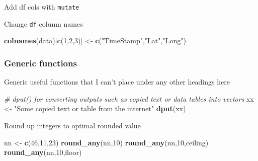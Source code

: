 \documentclass[10,portrait]{article}
\newenvironment{Shaded}{\begin{snugshade}}{\end{snugshade}}
\newcommand{\KeywordTok}[1]{\textcolor[rgb]{0.13,0.29,0.53}{\textbf{#1}}}
\newcommand{\DataTypeTok}[1]{\textcolor[rgb]{0.13,0.29,0.53}{#1}}
\newcommand{\DecValTok}[1]{\textcolor[rgb]{0.00,0.00,0.81}{#1}}
\newcommand{\StringTok}[1]{\textcolor[rgb]{0.31,0.60,0.02}{#1}}
\newcommand{\CommentTok}[1]{\textcolor[rgb]{0.56,0.35,0.01}{\textit{#1}}}
\newcommand{\OperatorTok}[1]{\textcolor[rgb]{0.81,0.36,0.00}{\textbf{#1}}}
\newcommand{\NormalTok}[1]{#1}
\begin{document}
Add df cols with \texttt{mutate}

\begin{Shaded}
\end{Shaded}

Change \texttt{df} column names

\begin{Shaded}
\begin{Highlighting}[]
\KeywordTok{colnames}\NormalTok{(data)[}\KeywordTok{c}\NormalTok{(}\DecValTok{1}\NormalTok{,}\DecValTok{2}\NormalTok{,}\DecValTok{3}\NormalTok{)] <-}\StringTok{ }\KeywordTok{c}\NormalTok{(}\StringTok{"TimeStamp"}\NormalTok{,}\StringTok{"Lat"}\NormalTok{,}\StringTok{"Long"}\NormalTok{)}
\end{Highlighting}
\end{Shaded}

\subsubsection{Generic functions}\label{generic-functions}

Generic useful functions that I can't place under any other headings
here

\begin{Shaded}
\begin{Highlighting}[]
\CommentTok{# dput() for converting outputs such as copied text or data tables into vectors}
\NormalTok{xx <-}\StringTok{ "Some copied text or table from the internet"}
\KeywordTok{dput}\NormalTok{(xx)}
\end{Highlighting}
\end{Shaded}

Round up integers to optimal rounded value

\begin{Shaded}
\begin{Highlighting}[]
\NormalTok{nn <-}\StringTok{ }\KeywordTok{c}\NormalTok{(}\DecValTok{46}\NormalTok{,}\DecValTok{11}\NormalTok{,}\DecValTok{23}\NormalTok{)}
\KeywordTok{round_any}\NormalTok{(nn,}\DecValTok{10}\NormalTok{)}
\KeywordTok{round_any}\NormalTok{(nn,}\DecValTok{10}\NormalTok{,ceiling)}
\KeywordTok{round_any}\NormalTok{(nn,}\DecValTok{10}\NormalTok{,floor)}
\end{Highlighting}
\end{Shaded}
\end{document}
